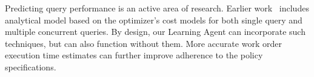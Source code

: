 Predicting query performance is an active area of research. 
Earlier work~\cite{wu2013towards, wu2014uncertainty, duggan2011performance} includes analytical model based on the optimizer's cost models for both single query and multiple concurrent queries.
By design, our Learning Agent can incorporate such techniques, but can also function without them. 
More accurate work order execution time estimates can further improve adherence to the policy specifications.


